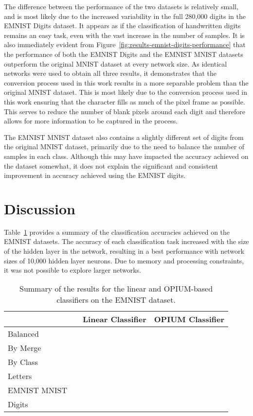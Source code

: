 \documentclass[conference]{IEEEtran}
\begin{document}
The difference between the performance of the two datasets is relatively small, and is most likely due to the increased variability in the full 280,000 digits in the EMNIST Digits dataset. It appears as if the classification of handwritten digits remains an easy task, even with the vast increase in the number of samples. It is also immediately evident from Figure~\ref{fig:results-emnist-digits-performance} that the performance of both the EMNIST Digits and the EMNIST MNIST datasets outperform the original MNIST dataset at every network size. As identical networks were used to obtain all three results, it demonstrates that the conversion process used in this work results in a more separable problem than the original MNIST dataset. This is most likely due to the conversion process used in this work ensuring that the character fills as much of the  pixel frame as possible. This serves to reduce the number of blank pixels around each digit and therefore allows for more information to be captured in the process. 

The EMNIST MNIST dataset also contains a slightly different set of digits from the original MNIST dataset, primarily due to the need to balance the number of samples in each class. Although this may have impacted the accuracy achieved on the dataset somewhat, it does not explain the significant and consistent improvement in accuracy achieved using the EMNIST digits.
 
\section{Discussion}
\label{sec:results-summary}

Table~\ref{table-results-summary} provides a summary of the classification accuracies achieved on the EMNIST datasets. The accuracy of each classification task increased with the size of the hidden layer in the network, resulting in a best performance with network sizes of 10,000 hidden layer neurons. Due to memory and processing constraints, it was not possible to explore larger networks. 



\begin{table}[]
\centering
\caption{Summary of the results for the linear and OPIUM-based classifiers on the EMNIST dataset.}
\label{table-results-summary}
\begin{tabular}{llll}
\toprule
             &  & Linear Classifier & OPIUM Classifier \\ \midrule
Balanced     &  &  &      \\
By Merge     &  &  &      \\
By Class     &  &  &      \\
Letters      &  &  &      \\
EMNIST MNIST &  &  &      \\
Digits       &  &  &      \\
\bottomrule
\end{tabular}
\end{table}
\end{document}
